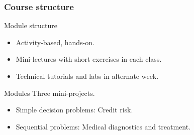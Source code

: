 \begin{frame}
  \frametitle{Course structure}
  \begin{block}{Module structure}
    \begin{itemize}
    \item \alert{Activity}-based, hands-on.
    \item Mini-lectures with short exercises in each class.
    \item Technical tutorials and labs in alternate week.
    \end{itemize}
  \end{block}
  
  \begin{block}{Modules}
    Three mini-projects.
    \begin{itemize}
    \item Simple decision problems: Credit risk.
    \item Sequential problems: Medical diagnostics and treatment.
    \end{itemize}
  \end{block}
\end{frame}

